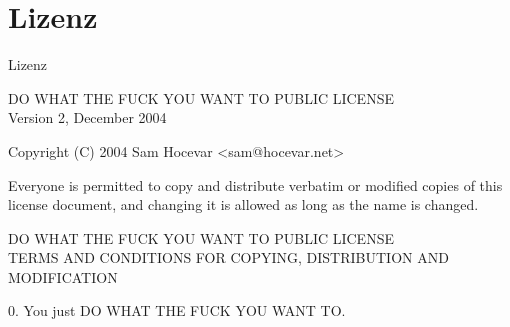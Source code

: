 \section{Lizenz}
\begin{fframe}{Lizenz}
\begin{center}
            DO WHAT THE FUCK YOU WANT TO PUBLIC LICENSE \\
                    Version 2, December 2004 \bigskip

 Copyright (C) 2004 Sam Hocevar <sam@hocevar.net> \bigskip

 Everyone is permitted to copy and distribute verbatim or modified
 copies of this license document, and changing it is allowed as long
 as the name is changed. \bigskip

            DO WHAT THE FUCK YOU WANT TO PUBLIC LICENSE \\
   TERMS AND CONDITIONS FOR COPYING, DISTRIBUTION AND MODIFICATION \bigskip

  0. You just DO WHAT THE FUCK YOU WANT TO.
\end{center}


\end{fframe}
